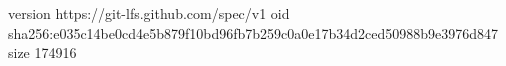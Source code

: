 version https://git-lfs.github.com/spec/v1
oid sha256:e035c14be0cd4e5b879f10bd96fb7b259c0a0e17b34d2ced50988b9e3976d847
size 174916
